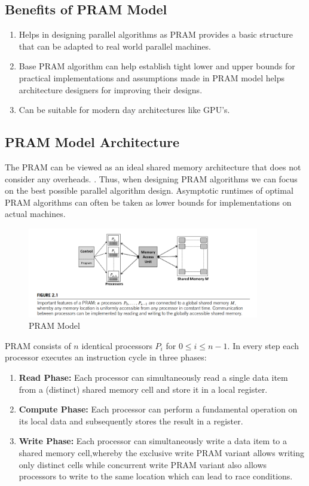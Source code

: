 \documentclass{article}
\begin{document}
\subsection*{Benefits of PRAM Model}
\begin{enumerate}
    \item Helps in designing parallel algorithms as PRAM provides a basic structure that can be adapted to real world parallel machines.
    \item Base PRAM algorithm can help establish tight lower and upper bounds for practical implementations and assumptions made in PRAM model helps architecture designers for improving their designs.
    \item Can be suitable for modern day architectures like GPU's.
\end{enumerate}

\newpage

\subsection*{PRAM Model Architecture}
The PRAM can be viewed as an ideal shared memory architecture that does not consider any overheads. . Thus, when designing PRAM algorithms we can focus on the best possible parallel algorithm design. Asymptotic runtimes of optimal PRAM algorithms can often be 
taken as lower bounds for implementations on actual machines.

\begin{figure}[h]
    \centering
    \includegraphics[width=0.9\textwidth]{Images/PRAM.png}
    \caption{PRAM Model}
\end{figure}

PRAM consists of $n$ identical processors $P_i$ for $0 \leq i \leq n-1$. In every step each processor executes an instruction cycle in three phases:
\begin{enumerate}
    \item \textbf{Read Phase:} Each processor can simultaneously read a single data item from a (distinct) shared memory cell and store it in a local register.
    \item \textbf{Compute Phase:} Each processor can perform a fundamental operation on its local data and subsequently stores the result in a register.
    \item \textbf{Write Phase:} Each processor can simultaneously write a data item to a shared memory cell,whereby the exclusive write PRAM variant allows writing only distinct cells while concurrent write PRAM variant also allows processors to write to the same location which can lead to race conditions.
\end{enumerate} 
\end{document}
